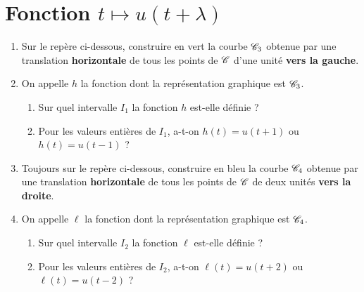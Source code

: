 \documentclass[10pt,openright,twoside,french]{book}
\begin{document}
\begin{center}
\end{center}

\section*{Fonction $t \mapsto u(t + \lambda)$}

\begin{enumerate}
	\item Sur le repère ci-dessous, construire en vert la courbe $\mathscr{C}_3$ obtenue par une translation \textbf{horizontale} de tous les points de $\mathscr{C}$ d'une unité \textbf{vers la gauche}.
	\item On appelle $h$ la fonction dont la représentation graphique est $\mathscr{C}_3$.
	\begin{enumerate}
		\item Sur quel intervalle $I_1$ la fonction $h$ est-elle définie ?
		\item Pour les valeurs entières de $I_1$, a-t-on $h(t) = u(t + 1)$ ou $h(t) = u(t - 1)$ ?
	\end{enumerate}
	\item Toujours sur le repère ci-dessous, construire en bleu la courbe $\mathscr{C}_4$ obtenue par une translation \textbf{horizontale} de tous les points de $\mathscr{C}$ de deux unités \textbf{vers la droite}.
	\item On appelle $\ell$ la fonction dont la représentation graphique est $\mathscr{C}_4$.
	\begin{enumerate}
		\item Sur quel intervalle $I_2$ la fonction $\ell$ est-elle définie ?
		\item Pour les valeurs entières de $I_2$, a-t-on $\ell(t) = u(t + 2)$ ou $\ell(t) = u(t - 2)$ ?
	\end{enumerate}
\end{enumerate}
\end{document}
